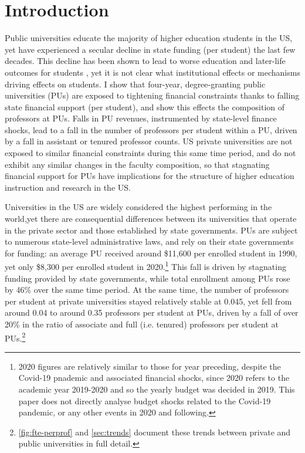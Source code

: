 \documentclass[notitlepage,12pt]{article}
\begin{document}
\section{Introduction}
\noindent
Public universities educate the majority of higher education students in the US, yet have experienced a secular decline in state funding (per student) the last few decades.
This decline has been shown to lead to worse education and later-life outcomes for students \citep{NBERw23736,NBERw27885}, yet it is not clear what institutional effects or mechanisms driving effects on students.
I show that four-year, degree-granting public universities (PUs) are exposed to tightening financial constraints thanks to falling state financial support (per student), and show this effects the composition of professors at PUs.
Falls in PU revenues, instrumented by state-level finance shocks, lead to a fall in the number of professors per student within a PU, driven by a fall in assistant or tenured professor counts.
US private universities are not exposed to similar financial constraints during this same time period, and do not exhibit any similar changes in the faculty composition, so that stagnating financial support for PUs have implications for the structure of higher education instruction and research in the US.

Universities in the US are widely considered the highest performing in the world,yet there are consequential differences between its universities that operate in the private sector and those established by state governments.
PUs are subject to numerous state-level administrative laws, and rely on their state governments for funding: an average PU received around \$11,600 per enrolled student in 1990, yet only \$8,300 per enrolled student in 2020.\footnote{
    2020 figures are relatively similar to those for year preceding, despite the Covid-19 pnademic and associated financial shocks, since 2020 refers to the academic year 2019-2020 and so the yearly budget was decided in 2019.
    This paper does not directly analyse budget shocks related to the Covid-19 pandemic, or any other events in 2020 and following.
}
This fall is driven by stagnating funding provided by state governments, while total enrollment among PUs rose by 46\% over the same time period.
At the same time, the number of professors per student at private universities stayed relatively stable at 0.045, yet fell from around 0.04 to around 0.35 professors per student at PUs, driven by a fall of over 20\% in the ratio of associate and full (i.e. tenured) professors per student at PUs.\footnote{
    \autoref{fig:fte-perprof} and \autoref{sec:trends} document these trends between private and public universities in full detail.
}
\end{document}
